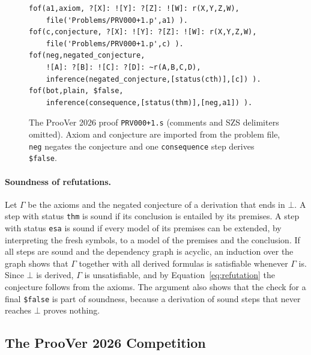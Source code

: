 \begin{figure}[!htb]
\centering
\begin{minipage}{0.74\linewidth}
\begin{verbatim}
fof(a1,axiom, ?[X]: ![Y]: ?[Z]: ![W]: r(X,Y,Z,W),
    file('Problems/PRV000+1.p',a1) ).
fof(c,conjecture, ?[X]: ![Y]: ?[Z]: ![W]: r(X,Y,Z,W),
    file('Problems/PRV000+1.p',c) ).
fof(neg,negated_conjecture,
    ![A]: ?[B]: ![C]: ?[D]: ~r(A,B,C,D),
    inference(negated_conjecture,[status(cth)],[c]) ).
fof(bot,plain, $false,
    inference(consequence,[status(thm)],[neg,a1]) ).
\end{verbatim}
\end{minipage}
\caption{The ProoVer 2026 proof \texttt{PRV000+1.s} (comments and SZS delimiters omitted). Axiom and conjecture are imported from the problem file, \texttt{neg} negates the conjecture and one \texttt{consequence} step derives \texttt{\$false}.}
\label{fig:example-derivation}
\end{figure}

\paragraph{Soundness of refutations.}
\label{subsec:proof-objects-soundness}

Let $\Gamma$ be the axioms and the negated conjecture of a derivation that ends in $\bot$.
A step with status \texttt{thm} is sound if its conclusion is entailed by its premises.
A step with status \texttt{esa} is sound if every model of its premises can be extended, by interpreting the fresh symbols, to a model of the premises and the conclusion.
If all steps are sound and the dependency graph is acyclic, an induction over the graph shows that $\Gamma$ together with all derived formulas is satisfiable whenever $\Gamma$ is.
Since $\bot$ is derived, $\Gamma$ is unsatisfiable, and by Equation~\ref{eq:refutation} the conjecture follows from the axioms.
The argument also shows that the check for a final \texttt{\$false} is part of soundness, because a derivation of sound steps that never reaches $\bot$ proves nothing.

\subsection{The ProoVer 2026 Competition}
\label{subsec:proover2026}

